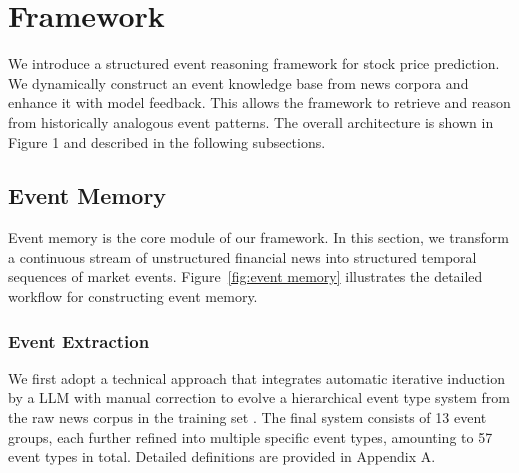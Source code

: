 \documentclass[sigconf, nonacm]{acmart} %
\begin{document}
\section{Framework}
We introduce a structured event reasoning framework for stock price prediction. 
We dynamically construct an event knowledge base from news corpora and enhance it with model feedback. This allows the framework to retrieve and reason from historically analogous event patterns. The overall architecture is shown in Figure 1 and described in the following subsections.
\subsection{Event Memory}
\label{sec:subsection}
Event memory is the core module of our framework. In this section, we transform a continuous stream of unstructured financial news into structured temporal sequences of market events. Figure~\ref{fig:event memory} illustrates the detailed workflow for constructing event memory.

\subsubsection{Event Extraction}
\label{sec:subsubsection}
We first adopt a technical approach that integrates automatic iterative induction by a LLM with manual correction to evolve a hierarchical event type system from the raw news corpus in the training set
.
The final system consists of 13 event groups, each further refined into multiple specific event types, amounting to 57 event types in total. 
Detailed definitions are provided in Appendix A.
\end{document}
